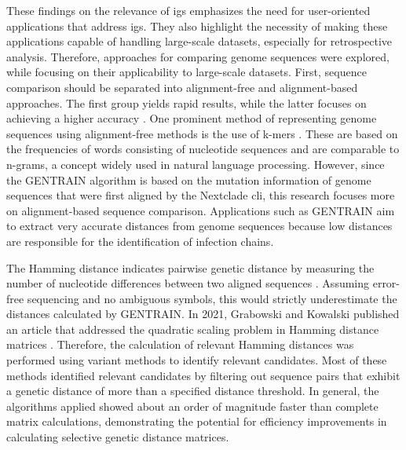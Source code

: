 These findings on the relevance of \acrshort{igs} emphasizes the need for user-oriented applications that address \acrshort{igs}. They also highlight the necessity of making these applications capable of handling large-scale datasets, especially for retrospective analysis. Therefore, approaches for comparing genome sequences were explored, while focusing on their applicability to large-scale datasets.
First, sequence comparison should be separated into alignment-free and alignment-based approaches. The first group yields rapid results, while the latter focuses on achieving a higher accuracy \cite{Lei1}. One prominent method of representing genome sequences using alignment-free methods is the use of k-mers \cite{Lei1}. These are based on the frequencies of words consisting of nucleotide sequences and are comparable to n-grams, a concept widely used in natural language processing. However, since the GENTRAIN algorithm is based on the mutation information of genome sequences that were first aligned by the Nextclade \acrshort{cli}, this research focuses more on alignment-based sequence comparison. Applications such as GENTRAIN aim to extract very accurate distances from genome sequences because low distances are responsible for the identification of infection chains.

The Hamming distance indicates pairwise genetic distance by measuring the number of nucleotide differences between two aligned sequences \cite{Hos1}. Assuming error-free sequencing and no ambiguous symbols, this would strictly underestimate the distances calculated by GENTRAIN. In 2021, Grabowski and Kowalski published an article that addressed the quadratic scaling problem in Hamming distance matrices \cite{Gra1}. Therefore, the calculation of relevant Hamming distances was performed using variant methods to identify relevant candidates. Most of these methods identified relevant candidates by filtering out sequence pairs that exhibit a genetic distance of more than a specified distance threshold. In general, the algorithms applied showed about an order of magnitude faster than complete matrix calculations, demonstrating the potential for efficiency improvements in calculating selective genetic distance matrices.

